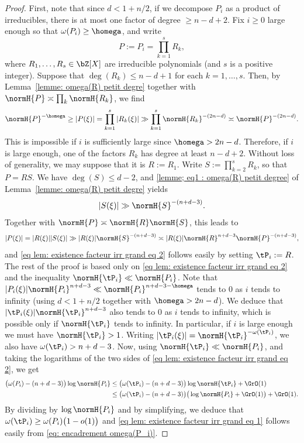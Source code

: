 \begin{proof}
First, note that since $d < 1+n/2$, if we decompose $P_i$ as a product of irreducibles, there is at most one factor of degree $\geq n-d+2$. Fix $i\geq 0$ large enough so that $\omega(P_i) \geq \homega$, and write
\[
P:=P_i = \prod_{k=1}^s R_k,
\]
where $R_1,\dots,R_s\in\bZ[X]$ are irreducible polynomials (and $s$ is a positive integer). Suppose that $\deg(R_k) \leq n-d+1$ for each $k=1,\dots,s$. Then, by Lemma~\ref{lemme: omega(R) petit degre} together with $\normH{P} \asymp \prod_k \normH{R_k}$, we find
\begin{equation*}
\normH{P}^{-\homega}\geq |P(\xi)| = \prod_{k=1}^{s} |R_k(\xi)| \gg \prod_{k=1}^{s} \normH{R_k}^{-(2n-d)} \asymp \normH{P}^{-(2n-d)}.
\end{equation*}
This is impossible if $i$ is sufficiently large since $\homega > 2n-d$. Therefore, if $i$ is large enough, one of the factors $R_k$ has degree at least $n-d+2$. Without loss of generality, we may suppose that it is $R:=R_1$.
Write $S:= \prod_{k = 2}^{s} R_k$, so that $P=RS$. We have $\deg(S) \leq d-2$, and \eqref{lemme; eq1 : omega(R) petit degree} of Lemma~\ref{lemme: omega(R) petit degre} yields
\begin{equation*}
|S(\xi)| \gg \normH{S}^{-(n+d-3)}.
\end{equation*}
Together with $\normH{P}\asymp \normH{R}\normH{S}$, this leads to
\begin{equation*}
|P(\xi)| = |R(\xi)||S(\xi)| \gg |R(\xi)|\normH{S}^{-(n+d-3)} \asymp |R(\xi)|\normH{R}^{n+d-3}\normH{P}^{-(n+d-3)},
\end{equation*}
and \eqref{eq lem: existence facteur irr grand eq 2} follows easily by setting $\tP_i:=R$. The rest of the proof is based only on \eqref{eq lem: existence facteur irr grand eq 2} and the inequality $\normH{\tP_i} \ll \normH{P_i}$. Note that $|P_i(\xi)|\normH{P_i}^{n+d-3} \ll \normH{P_i}^{n+d-3-\homega}$ tends to $0$ as $i$ tends to infinity (using $d < 1+n/2$ together with $\homega > 2n-d$). We deduce that $|\tP_i(\xi)|\normH{\tP_i}^{n+d-3}$ also tends to $0$ as $i$ tends to infinity, which is possible only if $\normH{\tP_i}$ tends to infinity. In particular, if $i$ is large enough we must have $\normH{\tP_i} > 1$. Writing $|\tP_i(\xi)| = \normH{\tP_i}^{-\omega(\tP_i)}$, we also have $\omega(\tP_i) > n+d-3$. Now, using $\normH{\tP_i}\ll \normH{P_i}$, and taking the logarithms of the two sides of \eqref{eq lem: existence facteur irr grand eq 2}, we get
\begin{align*}
\big(\omega(P_i)-(n+d-3)\big)\log \normH{P_i} & \leq \big(\omega(\tP_i)-(n+d-3)\big)\log \normH{\tP_i} + \GrO(1) \\
& \leq \big(\omega(\tP_i)-(n+d-3)\big)\big(\log \normH{P_i}+\GrO(1)\big) + \GrO(1).
\end{align*}
By dividing by $\log \normH{P_i}$ and by simplifying, we deduce that $\omega(\tP_i) \geq \omega(P_i)\big (1 - o(1)\big)$ and \eqref{eq lem: existence facteur irr grand eq 1} follows easily from \eqref{eq: encadrement omega(P_i)}.
\end{proof}

